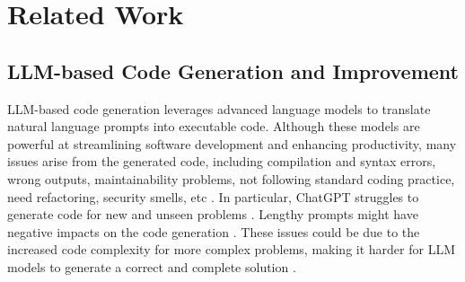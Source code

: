 \section{Related Work}
\label{sec:related_work}
\subsection{LLM-based Code Generation and Improvement}
LLM-based code generation leverages advanced language models \cite{li2022competition,nijkamp2022codegen,roziere2023code} to translate natural language prompts into executable code. Although these models are powerful at streamlining software development and enhancing productivity, many issues arise from the generated code, including compilation and syntax errors, wrong outputs, maintainability problems, not following standard coding practice, need refactoring, security smells, etc \cite{tian2023chatgpt, liu2024refining,liu2024no,siddiq2024quality}. In particular, ChatGPT struggles to generate code for new and unseen problems \cite{tian2023chatgpt}. Lengthy prompts might have negative impacts on the code generation \cite{tian2023chatgpt, liu2024refining}. {These issues} %
could be due to the increased {code complexity for more complex problems}, %
making it harder for {LLM models} %
to generate a correct and complete solution \cite{liu2024refining}. 


